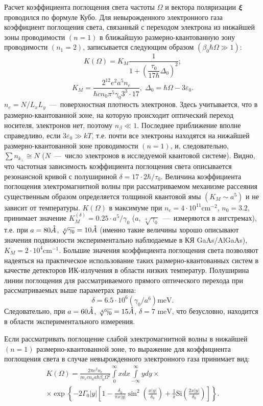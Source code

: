 Расчет коэффициента поглощения света частоты $\Omega$ и вектора поляризации $\vect{\xi}$ проводился по формуле Кубо.
Для невырожденного электронного газа коэффициент поглощения света, связанный с переходом электрона из нижайшей зоны проводимости $(n=1)$ в ближайшую размерно-квантованную зону проводимости $(n_1=2)$, записывается следующим образом $(\beta _0\hbar \Omega \gg 1)$:
\begin{equation} \label{eq:syn_6}
K(\Omega) = K_M \frac{1}{1+\left(\dfrac{\tau_0 }{17 \hbar} \Delta_0 \right)^2 } ;
\end{equation} 
\[
K_M =\frac{2^{12} e^2 a^5 n_e }{\hbar cn_0 \pi^5 \gamma_0 3^3 \cdot 17}, \;
\Delta_0 =\hbar \Omega -3\varepsilon_0.
\]
$n_e =N/L_x L_y $~---~поверхностная плотность электронов. Здесь учитывается, что в размерно-квантованной зоне, на которую происходит оптический переход носителя, электронов нет, поэтому $n_{\beta } \ll 1$. Последнее приближение вполне справедливо, если  $3\varepsilon_0 \gg kT$, т.е. почти все электроны находятся на нижайшей размерно-квантованной зоне проводимости $(n=1)$, и, следовательно, $\sum n_{k_{\bot } } \cong N$ ($N$~---~число электронов в исследуемой квантовой системе). Видно, что частотная зависимость коэффициента поглощения света описывается резонансной кривой с полушириной  $\delta =17\cdot 2\hbar /\tau_0 $. Величина коэффициента поглощения электромагнитной волны при рассматриваемом механизме рассеяния существенным образом определяется толщиной квантовой ямы $\left(K_M \sim a^5 \right)$ и не зависит от температуры. $K\left(\Omega \right)$  в максимуме при $n_e =4\cdot 10^{11} \text{cm}^{-2} $, $n_0 = 3.2$,   принимает значение   $K_M^{\left(\delta \right)} =0.25\cdot a^5 /\gamma_0 $ ($a$, $\sqrt[4]{\gamma_0}$~--–~измеряются в ангстремах), т.е. при  $a = 80 \AA$,  $\sqrt[4]{\gamma_0} = 10 \AA$ (именно такие величины хорошо описывают значения подвижности   экспериментально наблюдаемые в КЯ GaAs/AlGaAs), $K_M =2\cdot 10^4 \text{cm}^{-1} $. Большие значения коэффициента поглощения света позволяют надеяться на практическое использование таких размерно-квантованных систем в качестве детекторов ИК-излучения в области низких температур. Полуширина линии поглощения для рассматриваемого прямого оптического перехода при рассматриваемых выше параметрах равна:
\[
\delta =6.5\cdot 10^6 \left(\gamma_0 /a^6 \right)\text{meV}.
\]
Следовательно, при  $a = 60 \AA$,  $\sqrt[4]{\gamma_0} = 15 \AA$,  $\delta = 7 \text{ meV}$, что безусловно, находится в области экспериментального измерения.

Если рассматривать поглощение слабой электромагнитной волны в нижайшей $(n=1)$ размерно-квантованной зоне, то выражение для коэффициента поглощения света в случае невырожденного электронного газа принимает вид:
\begin{multline} \label{eq:syn_07}
K(\Omega) = \frac{2 \pi e^2 n_e }{m_e c n_0 a \hbar \beta_0 \Omega^2} \int\limits_0^{\infty}x dx \int\limits_{-\infty}^{\infty}y dy \times \\
\times \exp{\left\lbrace  - 2\Gamma_0 |y| \left[ 1 - \frac{\delta_0}{\pi x |y|}\sin^2{\left( \frac{x|y|}{\delta_0}\right) } + \frac{1}{\pi} \mathrm{Si}{\left( \frac{2x|y|}{\delta_0}\right) } \right]  \right\rbrace   }.
\end{multline} 


